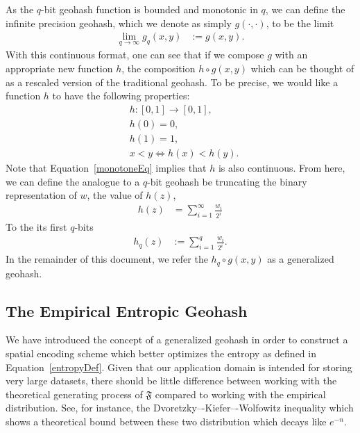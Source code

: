 \documentclass{article} %
\begin{document}
As the $q$-bit geohash function is bounded and monotonic in $q$, we can define the infinite
precision geohash, which we denote as simply $g(\cdot, \cdot)$, to be the limit
\begin{align}
\lim_{q \rightarrow \infty} g_q(x,y) &:= g(x,y).
\end{align}
With this continuous format, one can see that if we compose $g$ with an appropriate new function
$h$, the composition $h \circ g(x,y)$ which can be thought of as a rescaled version of the
traditional geohash. To be precise, we would like a function $h$ to have the following properties:
\begin{align}
&h: [0,1] \rightarrow [0,1], \\ \label{hDef}
&h(0) = 0, \\
&h(1) = 1, \\
&x < y \iff h(x) < h(y). \label{monotoneEq}
\end{align}
Note that Equation~\ref{monotoneEq} implies that $h$ is also continuous. From here, we can define
the analogue to a $q$-bit geohash be truncating the binary representation of $w$, the value of
$h(z)$,
\begin{align}
h(z) &= \sum_{i=1}^{\infty} \frac{w_i}{2^i}
\end{align}
To the its first $q$-bits
\begin{align}
h_q(z) &:= \sum_{i=1}^{q} \frac{w_i}{2^i}.
\end{align}
In the remainder of this document, we refer the $h_q \circ g(x,y)$ as a generalized geohash.

\subsection{The Empirical Entropic Geohash}

We have introduced the concept of a generalized geohash in order to construct a spatial encoding
scheme which better optimizes the entropy as defined in Equation~\ref{entropyDef}. Given that
our application domain is intended for storing very large datasets, there should be little difference
between working with the theoretical generating process of $\mathfrak{F}$ compared to working
with the empirical distribution. See, for instance, the Dvoretzky–-Kiefer–-Wolfowitz inequality
which shows a theoretical bound between these two distribution which decays like $e^{-n}$.
\end{document}
